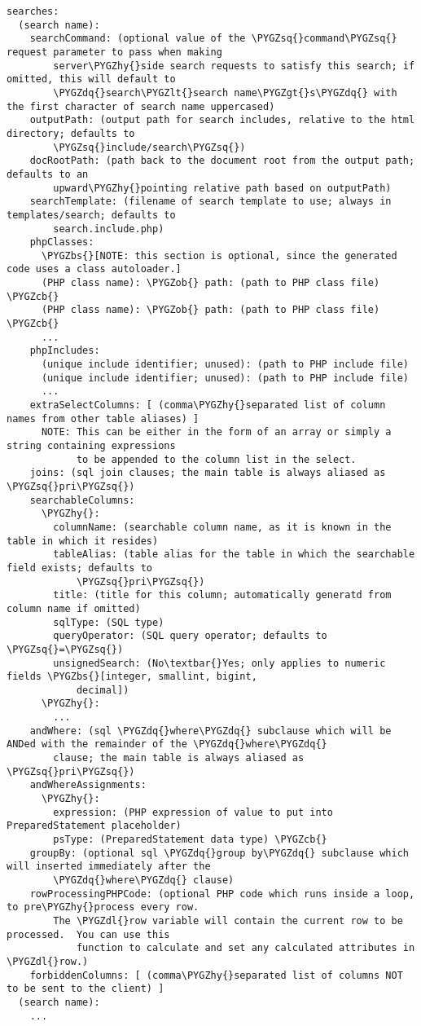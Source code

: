 \documentclass[letterpaper,10pt,english]{sphinxmanual}
\def\PYGZbs{\char`\\}
\def\PYGZob{\char`\{}
\def\PYGZcb{\char`\}}
\def\PYGZlt{\char`\<}
\def\PYGZgt{\char`\>}
\def\PYGZdl{\char`\$}
\def\PYGZhy{\char`\-}
\def\PYGZsq{\char`\'}
\def\PYGZdq{\char`\"}
\renewcommand\PYGZsq{\textquotesingle}
\begin{document}
\begin{Verbatim}[commandchars=\\\{\}]
searches:
  (search name):
    searchCommand: (optional value of the \PYGZsq{}command\PYGZsq{} request parameter to pass when making
        server\PYGZhy{}side search requests to satisfy this search; if omitted, this will default to
        \PYGZdq{}search\PYGZlt{}search name\PYGZgt{}s\PYGZdq{} with the first character of search name uppercased)
    outputPath: (output path for search includes, relative to the html directory; defaults to
        \PYGZsq{}include/search\PYGZsq{})
    docRootPath: (path back to the document root from the output path; defaults to an
        upward\PYGZhy{}pointing relative path based on outputPath)
    searchTemplate: (filename of search template to use; always in templates/search; defaults to
        search.include.php)
    phpClasses:
      \PYGZbs{}[NOTE: this section is optional, since the generated code uses a class autoloader.]
      (PHP class name): \PYGZob{} path: (path to PHP class file) \PYGZcb{}
      (PHP class name): \PYGZob{} path: (path to PHP class file) \PYGZcb{}
      ...
    phpIncludes:
      (unique include identifier; unused): (path to PHP include file)
      (unique include identifier; unused): (path to PHP include file)
      ...
    extraSelectColumns: [ (comma\PYGZhy{}separated list of column names from other table aliases) ]
      NOTE: This can be either in the form of an array or simply a string containing expressions
            to be appended to the column list in the select.
    joins: (sql join clauses; the main table is always aliased as \PYGZsq{}pri\PYGZsq{})
    searchableColumns:
      \PYGZhy{}:
        columnName: (searchable column name, as it is known in the table in which it resides)
        tableAlias: (table alias for the table in which the searchable field exists; defaults to
            \PYGZsq{}pri\PYGZsq{})
        title: (title for this column; automatically generatd from column name if omitted)
        sqlType: (SQL type)
        queryOperator: (SQL query operator; defaults to \PYGZsq{}=\PYGZsq{})
        unsignedSearch: (No\textbar{}Yes; only applies to numeric fields \PYGZbs{}[integer, smallint, bigint,
            decimal])
      \PYGZhy{}:
        ...
    andWhere: (sql \PYGZdq{}where\PYGZdq{} subclause which will be ANDed with the remainder of the \PYGZdq{}where\PYGZdq{}
        clause; the main table is always aliased as \PYGZsq{}pri\PYGZsq{})
    andWhereAssignments:
      \PYGZhy{}:
        expression: (PHP expression of value to put into PreparedStatement placeholder)
        psType: (PreparedStatement data type) \PYGZcb{}
    groupBy: (optional sql \PYGZdq{}group by\PYGZdq{} subclause which will inserted immediately after the
        \PYGZdq{}where\PYGZdq{} clause)
    rowProcessingPHPCode: (optional PHP code which runs inside a loop, to pre\PYGZhy{}process every row.
        The \PYGZdl{}row variable will contain the current row to be processed.  You can use this
            function to calculate and set any calculated attributes in \PYGZdl{}row.)
    forbiddenColumns: [ (comma\PYGZhy{}separated list of columns NOT to be sent to the client) ]
  (search name):
    ...
\end{Verbatim}
\end{document}

